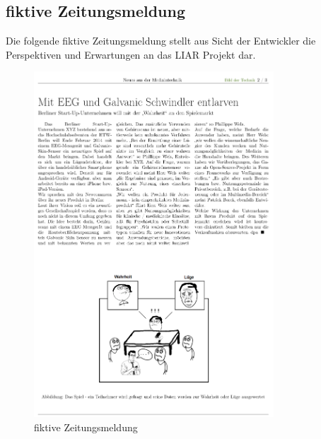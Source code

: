 \documentclass[10pt, a4paper, oneside, titlepage]{scrartcl} %
\begin{document}
   	\subsection{fiktive Zeitungsmeldung}
   	Die folgende fiktive Zeitungsmeldung stellt aus Sicht der Entwickler die Perspektiven und Erwartungen an das LIAR Projekt dar. 
	\begin{figure}[ht!]
		\begin{center}
			\includegraphics[width=0.8\textwidth]{zeitungsmeldung.png}
		\end{center}
		\caption[Zeitungsmeldung]{fiktive Zeitungsmeldung}
	\label{fig:zeitungsmeldung}
	\end{figure}   

\end{document}
